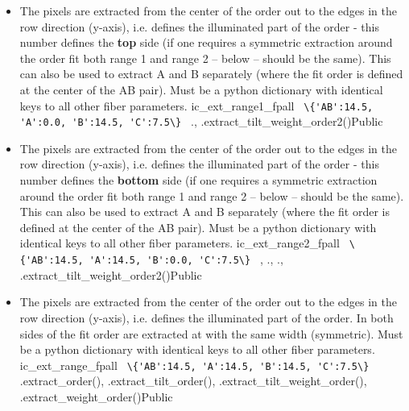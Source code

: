 \begin{itemize}
\item {}
{The pixels are extracted from the center of the order out to the edges in the row direction (y-axis), i.e. defines the illuminated part of the order - this number defines the \textbf{top} side (if one requires a symmetric extraction around the order fit both range 1 and range 2 -- below -- should be the same). This can also be used to extract A and B separately (where the fit order is defined at the center of the AB pair). Must be a python dictionary with identical keys to all other fiber parameters.}
{ic\_ext\_range1\_fpall}
{\lstinline[style=pythoninline]| \{'AB':14.5, 'A':0.0, 'B':14.5, 'C':7.5\} |}
{\calFFraw}{\constantsfile}
{\calextractRAW.\progMAIN, \spirouEXTOR.extract\_tilt\_weight\_order2()}{Public}

\item {}
{The pixels are extracted from the center of the order out to the edges in the row direction (y-axis), i.e. defines the illuminated part of the order - this number defines the \textbf{bottom} side (if one requires a symmetric extraction around the order fit both range 1 and range 2 -- below -- should be the same). This can also be used to extract A and B separately (where the fit order is defined at the center of the AB pair). Must be a python dictionary with identical keys to all other fiber parameters.}
{ic\_ext\_range2\_fpall}
{\lstinline[style=pythoninline]| \{'AB':14.5, 'A':14.5, 'B':0.0, 'C':7.5\} |}
{\calFFraw, \calextractRAW}{\constantsfile}
{\calFFraw.\progMAIN, \calextractRAW.\progMAIN, \spirouEXTOR.extract\_tilt\_weight\_order2()}{Public}

\item {}
{The pixels are extracted from the center of the order out to the edges in the row direction (y-axis), i.e. defines the illuminated part of the order. In \calextractRAW both sides of the fit order are extracted at with the same width (symmetric). Must be a python dictionary with identical keys to all other fiber parameters.}
{ic\_ext\_range\_fpall}
{\lstinline[style=pythoninline]| \{'AB':14.5, 'A':14.5, 'B':14.5, 'C':7.5\} |}
{\calextractRAW}{\constantsfile}
{\spirouEXTOR.extract\_order(), \spirouEXTOR.extract\_tilt\_order(), \spirouEXTOR.extract\_tilt\_weight\_order(), \spirouEXTOR.extract\_weight\_order()}{Public}


\end{itemize}
